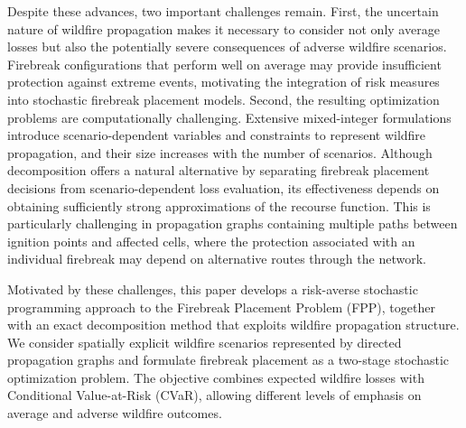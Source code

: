 \documentclass{itor}
\begin{document}
Despite these advances, two important challenges
remain. First, the uncertain nature of wildfire
propagation makes it necessary to consider not only
average losses but also the potentially severe
consequences of adverse wildfire scenarios.
Firebreak configurations that perform well on average
may provide insufficient protection against extreme
events, motivating the integration of risk measures
into stochastic firebreak placement models. Second,
the resulting optimization problems are computationally
challenging. Extensive mixed-integer formulations
introduce scenario-dependent variables and constraints
to represent wildfire propagation, and their size
increases with the number of scenarios. Although
decomposition offers a natural alternative by
separating firebreak placement decisions from
scenario-dependent loss evaluation, its effectiveness
depends on obtaining sufficiently strong approximations
of the recourse function. This is particularly
challenging in propagation graphs containing multiple
paths between ignition points and affected cells,
where the protection associated with an individual
firebreak may depend on alternative routes through
the network.

Motivated by these challenges, this paper develops
a risk-averse stochastic programming approach to
the Firebreak Placement Problem (FPP), together with
an exact decomposition method that exploits wildfire
propagation structure. We consider spatially explicit
wildfire scenarios represented by directed propagation
graphs and formulate firebreak placement as a two-stage
stochastic optimization problem. The objective combines
expected wildfire losses with Conditional Value-at-Risk
(CVaR), allowing different levels of emphasis on
average and adverse wildfire outcomes.
\end{document}
